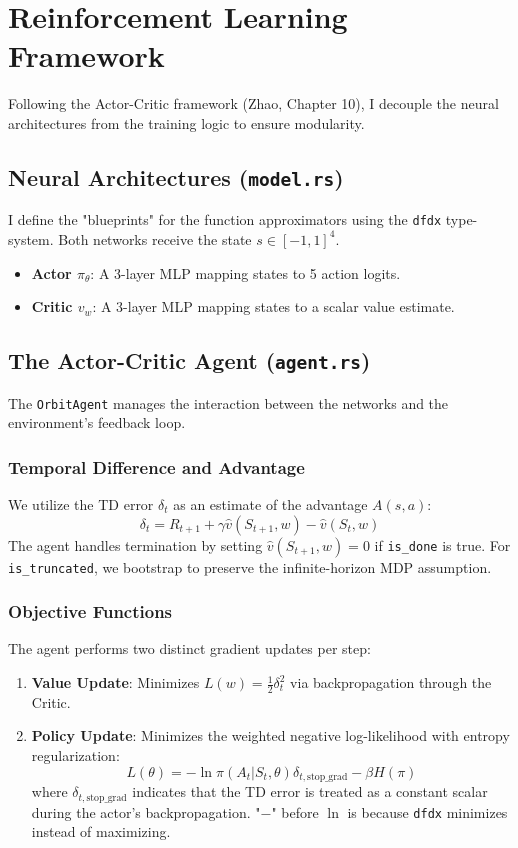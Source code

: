 \documentclass[12pt]{article}
\begin{document}
	\section{Reinforcement Learning Framework}
	
	Following the Actor-Critic framework (Zhao, Chapter 10), I decouple the neural architectures from the training logic to ensure modularity.
	
	\subsection{Neural Architectures (\texttt{model.rs})}
	I define the "blueprints" for the function approximators using the \texttt{dfdx} type-system. Both networks receive the state $s \in [-1, 1]^4$.
	\begin{itemize}
		\item \textbf{Actor $\pi_\theta$}: A 3-layer MLP mapping states to 5 action logits.
		\item \textbf{Critic $v_w$}: A 3-layer MLP mapping states to a scalar value estimate.
	\end{itemize}
	
	\subsection{The Actor-Critic Agent (\texttt{agent.rs})}
	The \texttt{OrbitAgent} manages the interaction between the networks and the environment's feedback loop.
	
	\subsubsection{Temporal Difference and Advantage}
	We utilize the TD error $\delta_t$ as an estimate of the advantage $A(s,a)$:
	$$ \delta_t = R_{t+1} + \gamma \hat{v}(S_{t+1}, w) - \hat{v}(S_t, w) $$
	The agent handles termination by setting $\hat{v}(S_{t+1}, w) = 0$ if \texttt{is\_done} is true. For \texttt{is\_truncated}, we bootstrap to preserve the infinite-horizon MDP assumption.
	
	\subsubsection{Objective Functions}
	The agent performs two distinct gradient updates per step:
	\begin{enumerate}
		\item \textbf{Value Update}: Minimizes $L(w) = \frac{1}{2} \delta_t^2$ via backpropagation through the Critic.
		\item \textbf{Policy Update}: Minimizes the weighted negative log-likelihood with entropy regularization:
		$$ L(\theta) = - \ln \pi(A_t | S_t, \theta) \delta_{t, \text{stop\_grad}} - \beta H(\pi) $$
		where $\delta_{t, \text{stop\_grad}}$ indicates that the TD error is treated as a constant scalar during the actor's backpropagation. "$-$" before $\ln$ is because \texttt{dfdx} minimizes instead of maximizing.
	\end{enumerate}
	
\end{document}
